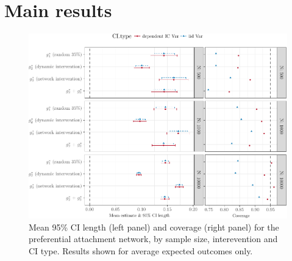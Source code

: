 \documentclass[english]{article}\usepackage[]{graphicx}\usepackage[]{color}
\makeatletter
\def\maxwidth{ %
  \ifdim\Gin@nat@width>\linewidth
    \linewidth
  \else
    \Gin@nat@width
  \fi
}
\newenvironment{knitrout}{}{} %
\theoremstyle{plain}
\theoremstyle{plain}
\makeatother
\begin{document}
\section{Main results}
\begin{knitrout}\footnotesize
{}\color{fgcolor}\begin{figure}

{\centering \includegraphics[width=\maxwidth]{TablesFigs/knitR-CIres_EY_prefattach-1} 

}

\caption[Mean 95\% CI length (left panel) and coverage (right panel) for the preferential attachment network, by sample size, interevention and CI type]{Mean 95\% CI length (left panel) and coverage (right panel) for the preferential attachment network, by sample size, interevention and CI type. Results shown for average expected outcomes only.}\label{fig:CIres.EY.prefattach}
\end{figure}


\end{knitrout}
\end{document}
